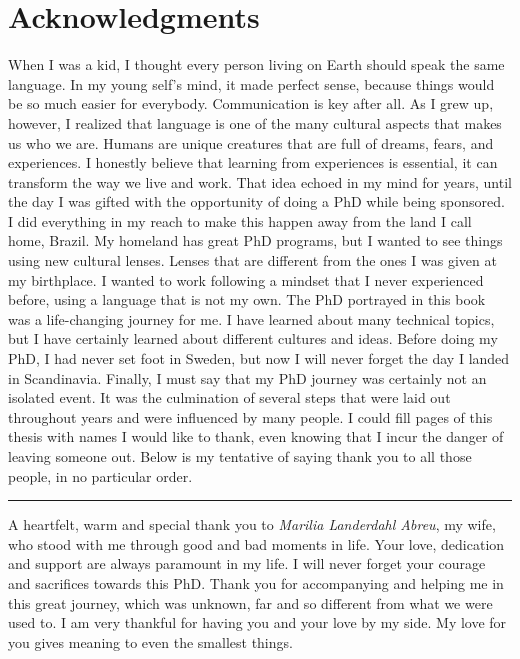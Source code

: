 \chapter*{Acknowledgments}

When I was a kid, I thought every person living on Earth should speak the same language. In my young self's mind, it made perfect sense, because things would be so much easier for everybody. Communication is key after all. As I grew up, however, I realized that language is one of the many cultural aspects that makes us who we are. Humans are unique creatures that are full of dreams, fears, and experiences. I honestly believe that learning from experiences is essential, it can transform the way we live and work. That idea echoed in my mind for years, until the day I was gifted with the opportunity of doing a PhD while being sponsored. I did everything in my reach to make this happen away from the land I call home, Brazil. My homeland has great PhD programs, but I wanted to see things using new cultural lenses. Lenses that are different from the ones I was given at my birthplace. I wanted to work following a mindset that I never experienced before, using a language that is not my own. The PhD portrayed in this book was a life-changing journey for me. I have learned about many technical topics, but I have certainly learned about different cultures and ideas. Before doing my PhD, I had never set foot in Sweden, but now I will never forget the day I landed in Scandinavia. Finally, I must say that my PhD journey was certainly not an isolated event. It was the culmination of several steps that were laid out throughout years and were influenced by many people. I could fill pages of this thesis with names I would like to thank, even knowing that I incur the danger of leaving someone out. Below is my tentative of saying thank you to all those people, in no particular order.

\vspace{7pt}\hrule\vspace{5pt}

A heartfelt, warm and special thank you to \textit{Marilia Landerdahl Abreu}, my wife, who stood with me through good and bad moments in life. Your love, dedication and support are always paramount in my life. I will never forget your courage and sacrifices towards this PhD. Thank you for accompanying and helping me in this great journey, which was unknown, far and so different from what we were used to. I am very thankful for having you and your love by my side. My love for you gives meaning to even the smallest things.

